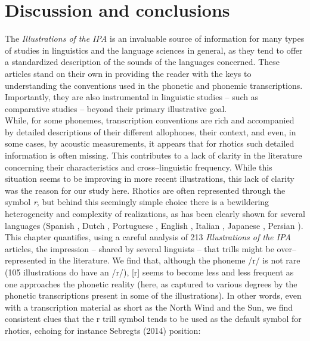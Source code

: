 \section{Discussion and conclusions}

The \textit{Illustrations of the IPA} is an invaluable source of information for many types of studies in linguistics and the language sciences in general, as they tend to offer a standardized description of the sounds of the languages concerned. These articles stand on their own in providing the reader with the keys to understanding the conventions used in the phonetic and phonemic transcriptions. Importantly, they are also instrumental in linguistic studies – such as comparative studies – beyond their primary illustrative goal.\\

While, for some phonemes, transcription conventions are rich and accompanied by detailed descriptions of their different allophones, their context, and even, in some cases, by acoustic measurements, it appears that for rhotics such detailed information is often missing. This contributes to a lack of clarity in the literature concerning their characteristics and cross–linguistic frequency. While this situation seems to be improving in more recent illustrations, this lack of clarity was the reason for our study here. Rhotics are often represented through the symbol \textit{r}, but behind this seemingly simple choice there is a bewildering heterogeneity and complexity of realizations, as has been clearly shown for several languages (Spanish \parencites{blecuaVibrantesEspanolManifestaciones2002,bradleyRhoticVariationConstrast2012,henriksenAcousticAnalysisRhotic2015,vigilRhoticsTaosNew2018}, Dutch \parencite{sebregtsSociophoneticsPhonologyDutch2014}, Portuguese \parencite{rennickeVariationChangeRhotics2015}, English \parencites{stuart-smithDerhoticisationScottishEnglish2014,jauriberryRhotiquesRhoticiteEcosse2016}, Italian \parencite{romano2013preliminary}, Japanese \parencite{magnusonWhatSoundsKansai2008}, Persian \parencite{rafatSocioPhoneticInvestigationRhotics2010}).\\

This chapter quantifies, using a careful analysis of 213 \textit{Illustrations of the IPA} articles, the impression – shared by several linguists – that trills might be over–represented in the literature. We find that, although the phoneme /r/ is not rare (105 illustrations do have an /r/), [r] seems to become less and less frequent as one approaches the phonetic reality (here, as captured to various degrees by the phonetic transcriptions present in some of the illustrations). In other words, even with a transcription material as short as the North Wind and the Sun, we find consistent clues that the r trill symbol tends to be used as the default symbol for rhotics, echoing for instance Sebregts (2014) position:

